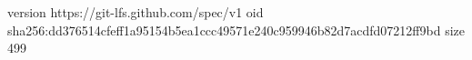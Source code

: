 version https://git-lfs.github.com/spec/v1
oid sha256:dd376514cfeff1a95154b5ea1ccc49571e240c959946b82d7acdfd07212ff9bd
size 499
